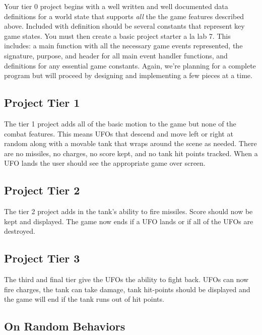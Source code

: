 \documentclass[nobib]{tufte-handout}
\begin{document}
Your tier 0 project begins with a well written and well documented data definitions for a world state that supports \textit{all} the the game features described above.  Included with definition should be several constants that represent key game states. You must then create a basic project starter a la lab 7. This includes: a main function with all the necessary game events represented, the signature, purpose, and header for all main event handler functions, and definitions for any essential game constants. Again, we're planning for a complete program but will proceed by designing and implementing a few pieces at a time.

\subsection*{Project Tier 1}

The tier 1 project adds all of the basic motion to the game but none of the combat features. This means UFOs that descend and move left or right at random along with a movable tank that wraps around the scene as needed. There are no missiles, no charges, no score kept, and no tank hit points tracked. When a UFO lands the user should see the appropriate game over screen.

\subsection*{Project Tier 2}

The tier 2 project adds in the tank's ability to fire missiles. Score should now be kept and displayed. The game now ends if a UFO lands or if all of the UFOs are destroyed.

\subsection*{Project Tier 3}

The third and final tier give the UFOs the ability to fight back. UFOs can now fire charges, the tank can take damage, tank hit-points should be displayed and the game will end if the tank runs out of hit points.

\subsection*{On Random Behaviors}
\end{document}
